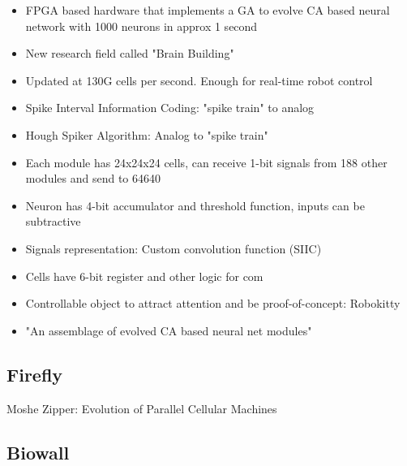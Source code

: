 \begin{itemize}
    \item FPGA based hardware that implements a GA to evolve CA based neural network with 1000 neurons in approx 1 second
    \item New research field called "Brain Building"
    \item Updated at 130G cells per second. Enough for real-time robot control
    \item Spike Interval Information Coding: "spike train" to analog
    \item Hough Spiker Algorithm: Analog to "spike train"
    \item Each module has 24x24x24 cells, can receive 1-bit signals from 188 other modules and send to 64640
    \item Neuron has 4-bit accumulator and threshold function, inputs can be subtractive
    \item Signals representation: Custom convolution function (SIIC)
    \item Cells have 6-bit register and other logic for com
    \item Controllable object to attract attention and be proof-of-concept: Robokitty
    \item "An assemblage of evolved CA based neural net modules"
\end{itemize}

\subsection{Firefly}

\TODO
Moshe Zipper: Evolution of Parallel Cellular Machines

\subsection{Biowall}

\TODO

